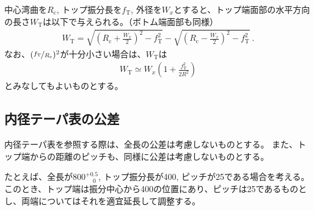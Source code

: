 \clearpage
中心湾曲を$R_\mathrm c$, トップ振分長を$f_\mathrm T$, 外径を$W_x$とすると、トップ端面部の水平方向の長さ$W_\mathrm T$は以下で与えられる。（ボトム端面部も同様）
\begin{align*}
  W_\mathrm T
  = \sqrt{\left(R_\mathrm c+\frac{W_x}2\right)^{\!2}-f_\mathrm T^2}
    -\sqrt{\left(R_\mathrm c-\frac{W_x}2\right)^{\!2}-f_\mathrm T^2}\ .
\end{align*}
なお、$(\nicefrac{f_\mathrm T}{R_\mathrm c})^2$が十分小さい場合は、$W_\mathrm T$は
\begin{align*}
  W_\mathrm T \simeq W_x\!\left(1+\frac{f_\mathrm T^2}{2R^2}\right)
\end{align*}
とみなしてもよいものとする。



\subsection{内径テーパ表の公差}
内径テーパ表を参照する際は、全長の公差は考慮しないものとする。
また、トップ端からの距離のピッチも、同様に公差は考慮しないものとする。
\begin{hosoku}
たとえば、全長が$800^{+0.5}_{\phantom -0}$, トップ振分長が400, ピッチが25である場合を考える。
このとき、トップ端は振分中心から400の位置にあり、ピッチは25であるものとし、両端についてはそれを適宜延長して調整する。
\end{hosoku}

